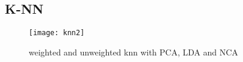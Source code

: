 
\subsection{K-NN}%
\label{sub:knn}
\begin{figure}[H]
    \centering
    \texttt{[image: knn2]}
    \caption{weighted and unweighted knn with PCA, LDA and NCA}%
    \label{fig:knn_pca_lda_nca}
\end{figure}
